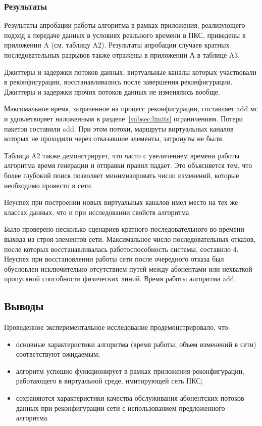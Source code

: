 \documentclass[12pt, a4paper]{article}
\begin{document}
\subsubsection{Результаты}

Результаты апробации работы алгоритма в рамках приложения, реализующего подход к передаче данных в условиях реального времени в ПКС, приведены в приложении A (см. таблицу A2). Результаты апробации случаев кратных последовательных разрывов также отражены в приложении А в таблице A3.

Джиттеры и задержки потоков данных, виртуальные каналы которых участвовали в реконфигурации, восстанавливались после завершения реконфигурации. Джиттеры и задержки прочих потоков данных не изменялись вообще.

Максимальное время, затраченное на процесс реконфигурации, составляет add мс и удовлетворяет наложенным в разделе~\ref{subsec:limits} ограничениям. Потери пакетов составили add. При этом потоки, маршруты виртуальных каналов которых не проходили через отказавшие элементы, затронуты не были.

Таблица A2 также демонстрирует, что часто с увеличением времени работы алгоритма время генерации и отправки правил падает. Это объясняется тем, что более глубокий поиск позволяет минимизировать число изменений, которые необходимо провести в сети.
 
Неуспех при построении новых виртуальных каналов имел место на тех же классах данных, что и при исследовании свойств алгоритма.

Было проверено несколько сценариев кратного последовательного во времени выхода из строя элементов сети. Максимальное число последовательных отказов, после которых восстанавливалась работоспособность системы, составило 4. Неуспех при восстановлении работы сети после очередного отказа был обусловлен исключительно отсутствием путей между абонентами или нехваткой пропускной способности физических линий. Время работы алгоритма add.

\subsection{Выводы}
Проведенное экспериментальное исследование продемонстрировало, что:
\begin{itemize}
	\item основные характеристики алгоритма (время работы, объем изменений в сети) соответствуют ожидаемым;
	\item алгоритм успешно функционирует в рамках приложения реконфигурации, работающего в виртуальной среде, имитирующей сеть ПКС;
	\item сохраняются характеристики качества обслуживания абонентских потоков данных при реконфигурации сети с использованием предложенного алгоритма.
\end{itemize}
\end{document}
